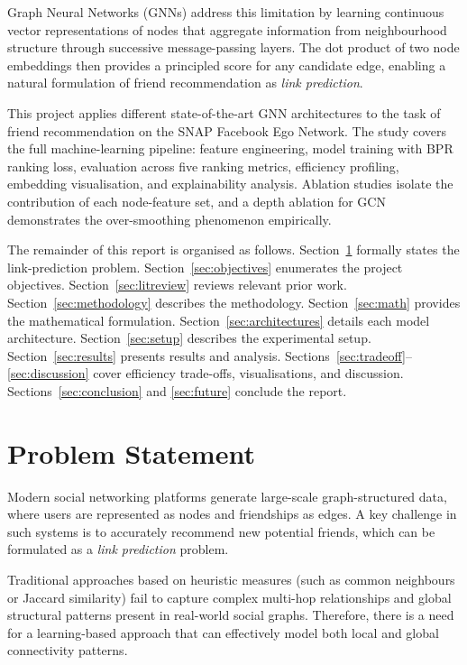 \documentclass[12pt,a4paper]{article}
\begin{document}
Graph Neural Networks (GNNs) address this limitation by learning continuous vector representations of nodes that aggregate information from neighbourhood structure through successive message-passing layers. The dot product of two node embeddings then provides a principled score for any candidate edge, enabling a natural formulation of friend recommendation as \textit{link prediction}.

This project applies different state-of-the-art GNN architectures to the task of friend recommendation on the SNAP Facebook Ego Network. The study covers the full machine-learning pipeline: feature engineering, model training with BPR ranking loss, evaluation across five ranking metrics, efficiency profiling, embedding visualisation, and explainability analysis. Ablation studies isolate the contribution of each node-feature set, and a depth ablation for GCN demonstrates the over-smoothing phenomenon empirically.

The remainder of this report is organised as follows. Section~\ref{sec:problem} formally states the link-prediction problem. Section~\ref{sec:objectives} enumerates the project objectives. Section~\ref{sec:litreview} reviews relevant prior work. Section~\ref{sec:methodology} describes the methodology. Section~\ref{sec:math} provides the mathematical formulation. Section~\ref{sec:architectures} details each model architecture. Section~\ref{sec:setup} describes the experimental setup. Section~\ref{sec:results} presents results and analysis. Sections~\ref{sec:tradeoff}--\ref{sec:discussion} cover efficiency trade-offs, visualisations, and discussion. Sections~\ref{sec:conclusion} and \ref{sec:future} conclude the report.

\section{Problem Statement}
\label{sec:problem}

Modern social networking platforms generate large-scale graph-structured data, where users are represented as nodes and friendships as edges. A key challenge in such systems is to accurately recommend new potential friends, which can be formulated as a \textit{link prediction} problem. 

Traditional approaches based on heuristic measures (such as common neighbours or Jaccard similarity) fail to capture complex multi-hop relationships and global structural patterns present in real-world social graphs. Therefore, there is a need for a learning-based approach that can effectively model both local and global connectivity patterns.
\end{document}
